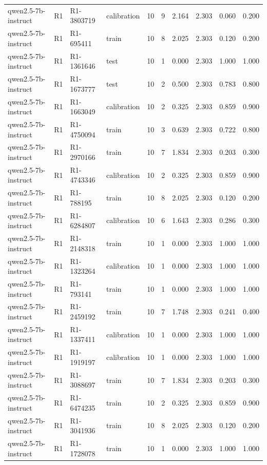\begin{table}
\begin{tabular}{llllrrrrrr}
qwen2.5-7b-instruct & R1 & R1-3803719 & calibration & 10 & 9 & 2.164 & 2.303 & 0.060 & 0.200 \\
qwen2.5-7b-instruct & R1 & R1-695411 & train & 10 & 8 & 2.025 & 2.303 & 0.120 & 0.200 \\
qwen2.5-7b-instruct & R1 & R1-1361646 & test & 10 & 1 & 0.000 & 2.303 & 1.000 & 1.000 \\
qwen2.5-7b-instruct & R1 & R1-1673777 & test & 10 & 2 & 0.500 & 2.303 & 0.783 & 0.800 \\
qwen2.5-7b-instruct & R1 & R1-1663049 & calibration & 10 & 2 & 0.325 & 2.303 & 0.859 & 0.900 \\
qwen2.5-7b-instruct & R1 & R1-4750094 & train & 10 & 3 & 0.639 & 2.303 & 0.722 & 0.800 \\
qwen2.5-7b-instruct & R1 & R1-2970166 & train & 10 & 7 & 1.834 & 2.303 & 0.203 & 0.300 \\
qwen2.5-7b-instruct & R1 & R1-4743346 & calibration & 10 & 2 & 0.325 & 2.303 & 0.859 & 0.900 \\
qwen2.5-7b-instruct & R1 & R1-788195 & train & 10 & 8 & 2.025 & 2.303 & 0.120 & 0.200 \\
qwen2.5-7b-instruct & R1 & R1-6284807 & calibration & 10 & 6 & 1.643 & 2.303 & 0.286 & 0.300 \\
qwen2.5-7b-instruct & R1 & R1-2148318 & train & 10 & 1 & 0.000 & 2.303 & 1.000 & 1.000 \\
qwen2.5-7b-instruct & R1 & R1-1323264 & calibration & 10 & 1 & 0.000 & 2.303 & 1.000 & 1.000 \\
qwen2.5-7b-instruct & R1 & R1-793141 & train & 10 & 1 & 0.000 & 2.303 & 1.000 & 1.000 \\
qwen2.5-7b-instruct & R1 & R1-2459192 & train & 10 & 7 & 1.748 & 2.303 & 0.241 & 0.400 \\
qwen2.5-7b-instruct & R1 & R1-1337411 & calibration & 10 & 1 & 0.000 & 2.303 & 1.000 & 1.000 \\
qwen2.5-7b-instruct & R1 & R1-1919197 & calibration & 10 & 1 & 0.000 & 2.303 & 1.000 & 1.000 \\
qwen2.5-7b-instruct & R1 & R1-3088697 & train & 10 & 7 & 1.834 & 2.303 & 0.203 & 0.300 \\
qwen2.5-7b-instruct & R1 & R1-6474235 & train & 10 & 2 & 0.325 & 2.303 & 0.859 & 0.900 \\
qwen2.5-7b-instruct & R1 & R1-3041936 & train & 10 & 8 & 2.025 & 2.303 & 0.120 & 0.200 \\
qwen2.5-7b-instruct & R1 & R1-1728078 & train & 10 & 1 & 0.000 & 2.303 & 1.000 & 1.000 \\

\end{tabular}
\end{table}
